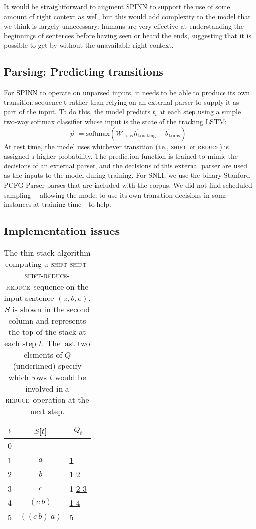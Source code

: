 \documentclass[11pt]{article}
\newcommand{\shift}{\textsc{shift}}
\newcommand{\reduce}{\textsc{reduce}}
\begin{document}
It would be straightforward to augment SPINN to support the use of some amount of right context as well, but this would add complexity to the model that we think is largely unnecessary: humans are very effective at understanding the beginnings of sentences before having seen or heard the ends, suggesting that it is possible to get by without the unavailable right context.

\subsection{Parsing: Predicting transitions}

For SPINN to operate on unparsed inputs, it needs to be able to produce its own transition sequence $\mathbf t$ rather than relying on an external parser to supply it as part of the input. To do this, the model predicts $t_t$ at each step using a simple two-way softmax classifier whose input is the state of the tracking LSTM:
\begin{equation}
\vec{p}_{\text{t}} = \text{softmax}(W_{\text{trans}}\vec{h}_{\text{tracking}} + \vec{b}_{\text{trans}})
\end{equation}
At test time, the model uses whichever transition (i.e., \shift\ or \reduce) is assigned a higher probability. The prediction function is trained to mimic the decisions of an external parser, and the decisions of this external parser are used as the inputs to the model during training. For SNLI, we use the binary Stanford PCFG Parser parses that are included with the corpus. We did not find scheduled sampling \citep{bengio2015scheduled}---allowing the model to use its own transition decisions in some instances at training time---to help.

\subsection{Implementation issues}

\begin{table}[t]
\centering
\begin{tabular}{c|cl}
  \toprule
  $t$ & $S$[$t$] & \multicolumn{1}{c}{$Q_t$} \\
  \midrule
  0 & & \underline{\hphantom{0} \hphantom{0}} \\
  1 & $a$ & \hphantom{0} \underline{\hphantom{0} 1} \\
  2 & $b$ & \hphantom{0} \hphantom{0} \underline{1 2} \\
  3 & $c$ & \hphantom{0} \hphantom{0} 1 \underline{2 3} \\
  4 & $(c~b)$ & \hphantom{0} \hphantom{0} \underline{1 4} \\
  5 & $((c~b)~a)$ & \hphantom{0} \underline{\hphantom{0} 5} \\
  \bottomrule
\end{tabular}
\caption{The thin-stack algorithm computing a \shift-\shift-\shift-\reduce-\reduce\ sequence on the input sentence $(a, b, c)$. $S$ is shown in the second column and represents the top of the stack at each step $t$. The last two elements of $Q$ (underlined) specify which rows $t$ would be involved in a \reduce\ operation at the next step.}
\label{tbl:thin-stack}
\end{table}
\end{document}
